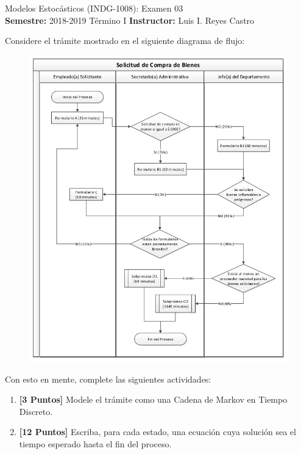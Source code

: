 \documentclass[ a4paper, twoside, 11pt]{article}
\newcommand{\numero}{03}
\begin{document}
\allowdisplaybreaks



\begin{center}
\Large Modelos Estoc\'asticos (INDG-1008): Examen \numero \\[1ex]
\small \textbf{Semestre:} 2018-2019 T\'ermino I \qquad
\textbf{Instructor:} Luis I. Reyes Castro
\end{center}
\fullskip

\begin{problem}
Considere el tr\'amite mostrado en el siguiente diagrama de flujo: 
\begin{figure}[H]
\centering
\includegraphics[width = 0.96\columnwidth]{figures/fig_burocracia.jpg}
\end{figure}
\fullcut

Con esto en mente, complete las siguientes actividades: 
\begin{enumerate}[label=\textbf{\alph*)}]
\item \textbf{[3 Puntos]} Modele el tr\'amite como una Cadena de Markov en Tiempo Discreto. 
\item \textbf{[12 Puntos]} Escriba, para cada estado, una ecuaci\'on cuya soluci\'on sea el tiempo esperado hasta el fin del proceso. 
\end{enumerate}
\QED

\end{problem}
\fullskip
\end{document}
